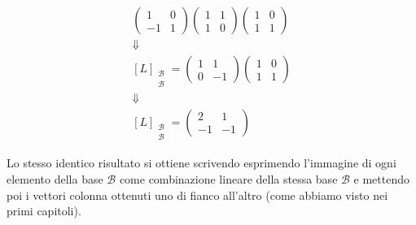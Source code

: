 \begin{example}
\begin{enumerate}
\begin{gather*}
\begin{pmatrix}
				      1  & 0 \\
				      -1 & 1
			      \end{pmatrix}
			      \begin{pmatrix}
				      1 & 1 \\
				      1 & 0
			      \end{pmatrix}
			      \begin{pmatrix}
				      1 & 0 \\
				      1 & 1
			      \end{pmatrix} \\
			      \Downarrow \\
			      [L]_{\substack{\mathcal{B} \\ \mathcal{B}}} =
			      \begin{pmatrix}
				      1 & 1  \\
				      0 & -1
			      \end{pmatrix}
			      \begin{pmatrix}
				      1 & 0 \\
				      1 & 1
			      \end{pmatrix} \\
			      \Downarrow \\
			      [L]_{\substack{\mathcal{B} \\ \mathcal{B}}} =
			      \begin{pmatrix}
				      2  & 1  \\
				      -1 & -1
			      \end{pmatrix}
		      \end{gather*}
	\end{enumerate}
	Lo stesso identico risultato si ottiene scrivendo esprimendo
	l'immagine di ogni elemento della base $\mathcal{B}$ come combinazione lineare
	della stessa base $\mathcal{B}$ e mettendo poi i vettori colonna ottenuti
	uno di fianco all'altro (come abbiamo visto nei primi capitoli).
\end{example}